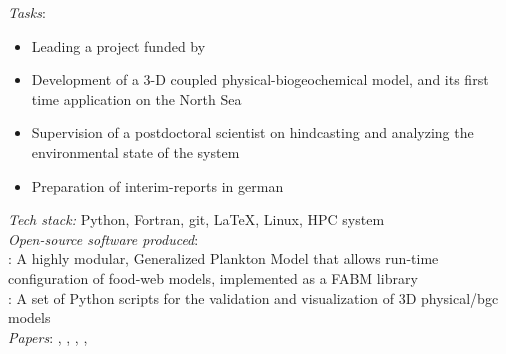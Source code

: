 \documentclass[
	a4paper,
]{fortysecondscv}
\begin{document}
\begin{cvtable}[1.0]
	{\href{https://www.hereon.de/}{\color{pblue}{Helmholtz-Zentrum Hereon, Germany}}}
	{\textit{Tasks}:
	\begin{itemize}[topsep=0pt,itemsep=0pt,partopsep=0pt, parsep=0pt, leftmargin=*]
     \item Leading a project funded by \href{https://www.umweltbundesamt.de/en}{\color{blue}{UBA}}
        \item Development of a 3-D coupled physical-biogeochemical model, and its first time application on the North Sea
        \item Supervision of a postdoctoral scientist on hindcasting and analyzing the environmental state of the system
        \item Preparation of interim-reports in german
    \end{itemize}
      \textit{Tech stack:} Python, Fortran, git, \LaTeX, Linux, HPC system\\
      \textit{Open-source software produced}:\\
      \href{https://github.com/OnurKerimoglu/FABM-GPM}{\color{pblue}{FABM-GPM}}: A highly modular,  Generalized Plankton Model that allows run-time configuration of food-web models, implemented as a FABM library\\
      \href{git@github.com:OnurKerimoglu/3Dval.git}{\color{pblue}{3Dval}}: A set of Python scripts for the validation and visualization of 3D physical/bgc models\\
      \textit{Papers}:
      \href{https://doi.org/10.3389/fmars.2019.00370}{\color{pblue}{1}}, 
      \href{https://doi.org/10.1029/2019JC015987}{\color{pblue}{2}}, 
      \href{https://doi.org/10.5194/bg-17-5097-2020}{\color{pblue}{3}}, 
      \href{https://doi.org/10.3389/fmars.2021.596126}{\color{pblue}{4}}, 
      \href{https://doi.org/10.3389/fmars.2021.637483}{\color{pblue}{5}}
      }
\end{cvtable}


\newpage



{\Huge\color{maincolor}\cvname}
\vspace*{-10mm}
\end{document}
